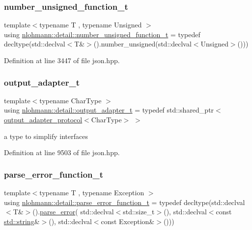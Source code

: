 \subsubsection{\texorpdfstring{number\_unsigned\_function\_t}{number\_unsigned\_function\_t}}
{\footnotesize\ttfamily template$<$typename T , typename Unsigned $>$ \\
using \mbox{\hyperlink{namespacenlohmann_1_1detail_a74da7b17bda76f65d276feb18209c913}{nlohmann\+::detail\+::number\+\_\+unsigned\+\_\+function\+\_\+t}} = typedef decltype(std\+::declval$<$T\&$>$().number\+\_\+unsigned(std\+::declval$<$Unsigned$>$()))}



Definition at line 3447 of file json.\+hpp.

\mbox{\label{namespacenlohmann_1_1detail_a9b680ddfb58f27eb53a67229447fc556}} 
\subsubsection{\texorpdfstring{output\_adapter\_t}{output\_adapter\_t}}
{\footnotesize\ttfamily template$<$typename Char\+Type $>$ \\
using \mbox{\hyperlink{namespacenlohmann_1_1detail_a9b680ddfb58f27eb53a67229447fc556}{nlohmann\+::detail\+::output\+\_\+adapter\+\_\+t}} = typedef std\+::shared\+\_\+ptr$<$\mbox{\hyperlink{structnlohmann_1_1detail_1_1output__adapter__protocol}{output\+\_\+adapter\+\_\+protocol}}$<$Char\+Type$>$ $>$}



a type to simplify interfaces 



Definition at line 9503 of file json.\+hpp.

\mbox{\label{namespacenlohmann_1_1detail_a264d4d58bc1fd82bcc7bf6bf73d6acad}} 
\subsubsection{\texorpdfstring{parse\_error\_function\_t}{parse\_error\_function\_t}}
{\footnotesize\ttfamily template$<$typename T , typename Exception $>$ \\
using \mbox{\hyperlink{namespacenlohmann_1_1detail_a264d4d58bc1fd82bcc7bf6bf73d6acad}{nlohmann\+::detail\+::parse\+\_\+error\+\_\+function\+\_\+t}} = typedef decltype(std\+::declval$<$T\&$>$().\mbox{\hyperlink{classnlohmann_1_1detail_1_1parse__error}{parse\+\_\+error}}( std\+::declval$<$std\+::size\+\_\+t$>$(), std\+::declval$<$const \mbox{\hyperlink{namespacenlohmann_1_1detail_a1ed8fc6239da25abcaf681d30ace4985ab45cffe084dd3d20d928bee85e7b0f21}{std\+::string}}\&$>$(), std\+::declval$<$const Exception\&$>$()))}



